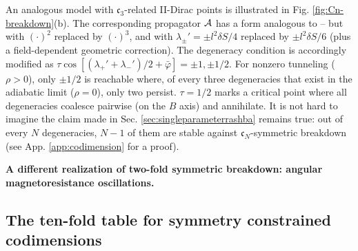 \documentclass[aps, prb, showpacs, twocolumn, notitlepage, superscriptaddress]{revtex4-1}
\begin{document}
An analogous model with $\mathfrak{c}_3$-related II-Dirac points  is illustrated in Fig. \ref{fig:Cn-breakdown}(b). The corresponding propagator ${\cal A}$ has a form analogous to  -- but with $(\cdot)^2$ replaced by $(\cdot)^3$, and with $\lambda_\pm'{=}\pm l^2\delta S/4$ replaced by $\pm l^2\delta S/6$ (plus a field-dependent geometric correction). The degeneracy condition is accordingly modified as $\tau\cos[(\lambda_+'{+}\lambda_-')/2{+}\bar{\varphi}]=\pm 1,\pm 1/2$. For nonzero tunneling ($\rho {>}0$), only $\pm 1/2$ is reachable where, of every three degeneracies that exist in the adiabatic limit ($\rho=0$), only two persist. $\tau=1/2$ marks a critical point where all degeneracies coalesce pairwise (on the $B$ axis) and annihilate. It is not hard to imagine the claim made in Sec. \ref{sec:singleparameterrashba} remains true: out of every $N$ degeneracies, $N-1$ of them are stable against $\mathfrak{c}_N$-symmetric breakdown (see App. \ref{app:codimension} for a proof).




\textbf{A different realization of two-fold symmetric breakdown: angular magnetoresistance oscillations.}

\subsection{The ten-fold table for symmetry constrained codimensions}
\end{document}
